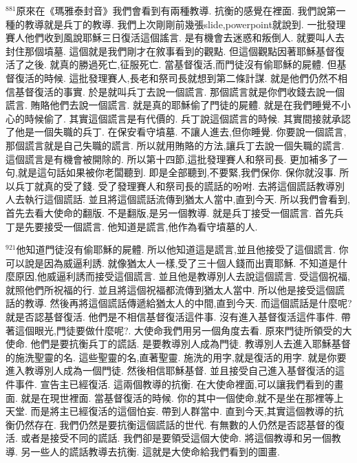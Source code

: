 \documentclass{book}
\begin{document}
$^{881}$原來在《瑪雅泰封音》我們會看到有兩種教導.
抗衡的感覺在裡面.
我們說第一種的教導就是兵丁的教導.
我們上次剛剛前幾張slide,powerpoint就說到.
一批發理賽人他們收到風說耶穌三日復活這個謠言.
是有機會去迷惑和叛倒人.
就要叫人去封住那個墳墓.
這個就是我們剛才在敘事看到的觀點.
但這個觀點因著耶穌基督復活了之後.
就真的勝過死亡,征服死亡.
當基督復活,而門徒沒有偷耶穌的屍體.
但基督復活的時候.
這批發理賽人,長老和祭司長就想到第二條計謀.
就是他們仍然不相信基督復活的事實.
於是就叫兵丁去說一個謊言.
那個謊言就是你們收錢去說一個謊言.
賄賂他們去說一個謊言.
就是真的耶穌偷了門徒的屍體.
就是在我們睡覺不小心的時候偷了.
其實這個謊言是有代價的.
兵丁說這個謊言的時候.
其實間接就承認了他是一個失職的兵丁.
在保安看守墳墓.
不讓人進去,但你睡覺.
你要說一個謊言,那個謊言就是自己失職的謊言.
所以就用賄賂的方法,讓兵丁去說一個失職的謊言.
這個謊言是有機會被開除的.
所以第十四節,這批發理賽人和祭司長.
更加補多了一句,就是這句話如果被你老闆聽到.
即是全部聽到,不要緊,我們保你.
保你就沒事.
所以兵丁就真的受了錢.
受了發理賽人和祭司長的謊話的吩咐.
去將這個謊話教導別人去執行這個謊話.
並且將這個謊話流傳到猶太人當中,直到今天.
所以我們會看到,首先去看大使命的翻版.
不是翻版,是另一個教導.
就是兵丁接受一個謊言.
首先兵丁是先要接受一個謊言.
他知道是謊言,他作為看守墳墓的人.

$^{921}$他知道門徒沒有偷耶穌的屍體.
所以他知道這是謊言,並且他接受了這個謊言.
你可以說是因為威逼利誘.
就像猶太人一樣,受了三十個人錢而出賣耶穌.
不知道是什麼原因,他威逼利誘而接受這個謊言.
並且他是教導別人去說這個謊言.
受這個祝福,就照他們所祝福的行.
並且將這個祝福都流傳到猶太人當中.
所以他是接受這個謊話的教導.
然後再將這個謊話傳遞給猶太人的中間,直到今天.
而這個謊話是什麼呢?就是否認基督復活.
他們是不相信基督復活這件事.
沒有進入基督復活這件事件.
帶著這個眼光,門徒要做什麼呢?.
大使命我們用另一個角度去看.
原來門徒所領受的大使命.
他們是要抗衡兵丁的謊話.
是要教導別人成為門徒.
教導別人去進入耶穌基督的施洗聖靈的名.
這些聖靈的名,直著聖靈.
施洗的用字,就是復活的用字.
就是你要進入教導別人成為一個門徒.
然後相信耶穌基督.
並且接受自己進入基督復活的這件事件.
宣告主已經復活.
這兩個教導的抗衡.
在大使命裡面,可以讓我們看到的畫面.
就是在現世裡面.
當基督復活的時候.
你的其中一個使命,就不是坐在那裡等上天堂.
而是將主已經復活的這個怕妄.
帶到人群當中.
直到今天,其實這個教導的抗衡仍然存在.
我們仍然是要抗衡這個謊話的世代.
有無數的人仍然是否認基督的復活.
或者是接受不同的謊話.
我們卻是要領受這個大使命.
將這個教導和另一個教導.
另一些人的謊話教導去抗衡.
這就是大使命給我們看到的圖畫.
\end{document}
